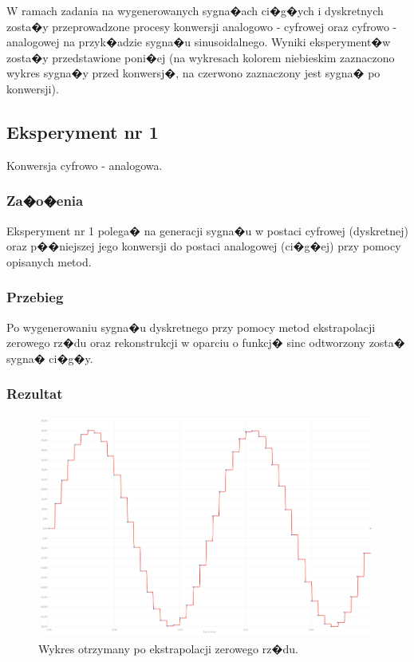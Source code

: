 \documentclass[12pt]{article}
\begin{document}
W ramach zadania na wygenerowanych sygna�ach ci�g�ych i dyskretnych zosta�y przeprowadzone procesy konwersji analogowo - cyfrowej oraz cyfrowo - analogowej na przyk�adzie sygna�u sinusoidalnego. Wyniki eksperyment�w zosta�y przedstawione poni�ej (na wykresach kolorem niebieskim zaznaczono wykres sygna�y przed konwersj�, na czerwono zaznaczony jest sygna� po konwersji).


\subsection{Eksperyment nr 1}

Konwersja cyfrowo - analogowa.

\subsubsection{Za�o�enia}
Eksperyment nr 1 polega� na generacji sygna�u w postaci cyfrowej (dyskretnej) oraz p��niejszej jego konwersji do postaci analogowej (ci�g�ej) przy pomocy opisanych metod.

\subsubsection{Przebieg}

Po wygenerowaniu sygna�u dyskretnego przy pomocy metod ekstrapolacji zerowego rz�du oraz rekonstrukcji w oparciu o funkcj� sinc odtworzony zosta� sygna� ci�g�y.

\subsubsection{Rezultat}

\begin{figure}[h!]
\includegraphics[scale=0.35]{w1.png}
\caption{Wykres otrzymany po ekstrapolacji zerowego rz�du.}
\end{figure}
\end{document}
